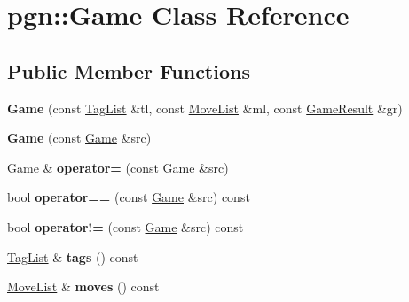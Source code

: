 \hypertarget{classpgn_1_1Game}{
\section{pgn::Game Class Reference}
\label{classpgn_1_1Game}
}
\subsection*{Public Member Functions}
\begin{DoxyCompactItemize}
\item 
\hypertarget{classpgn_1_1Game_af70cf1dfd509c2e8ec14905222ad02c4}{
{\bfseries Game} (const \hyperlink{classpgn_1_1TagList}{TagList} \&tl, const \hyperlink{classpgn_1_1MoveList}{MoveList} \&ml, const \hyperlink{classpgn_1_1GameResult}{GameResult} \&gr)}
\label{classpgn_1_1Game_af70cf1dfd509c2e8ec14905222ad02c4}

\item 
\hypertarget{classpgn_1_1Game_ac7301876d9b4e3b49af18b0fcdd67e96}{
{\bfseries Game} (const \hyperlink{classpgn_1_1Game}{Game} \&src)}
\label{classpgn_1_1Game_ac7301876d9b4e3b49af18b0fcdd67e96}

\item 
\hypertarget{classpgn_1_1Game_a0269e03dd3ec64fc52422e37a3eb5fc8}{
\hyperlink{classpgn_1_1Game}{Game} \& {\bfseries operator=} (const \hyperlink{classpgn_1_1Game}{Game} \&src)}
\label{classpgn_1_1Game_a0269e03dd3ec64fc52422e37a3eb5fc8}

\item 
\hypertarget{classpgn_1_1Game_a77fc6ee1f9df2cfe681cd3f5349ea406}{
bool {\bfseries operator==} (const \hyperlink{classpgn_1_1Game}{Game} \&src) const }
\label{classpgn_1_1Game_a77fc6ee1f9df2cfe681cd3f5349ea406}

\item 
\hypertarget{classpgn_1_1Game_aa37c1fd209b5c52c715b9b741eb008bf}{
bool {\bfseries operator!=} (const \hyperlink{classpgn_1_1Game}{Game} \&src) const }
\label{classpgn_1_1Game_aa37c1fd209b5c52c715b9b741eb008bf}

\item 
\hypertarget{classpgn_1_1Game_a2f6db558f0ad800a8550dc140d9b593b}{
\hyperlink{classpgn_1_1TagList}{TagList} \& {\bfseries tags} () const }
\label{classpgn_1_1Game_a2f6db558f0ad800a8550dc140d9b593b}

\item 
\hypertarget{classpgn_1_1Game_a0a5ba73b2f7a9b02fbc43369942ea26f}{
\hyperlink{classpgn_1_1MoveList}{MoveList} \& {\bfseries moves} () const }
\label{classpgn_1_1Game_a0a5ba73b2f7a9b02fbc43369942ea26f}


\end{DoxyCompactItemize}
